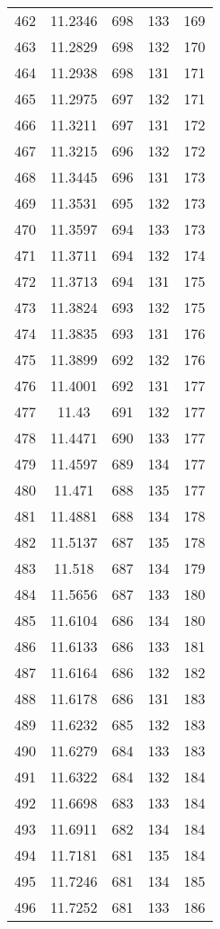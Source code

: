 \documentclass[12pt,a4paper]{article}
\begin{document}
\begin{tabular}{r|cccc}
	462 & 11.2346 & 698 & 133 & 169 \\
	463 & 11.2829 & 698 & 132 & 170 \\
	464 & 11.2938 & 698 & 131 & 171 \\
	465 & 11.2975 & 697 & 132 & 171 \\
	466 & 11.3211 & 697 & 131 & 172 \\
	467 & 11.3215 & 696 & 132 & 172 \\
	468 & 11.3445 & 696 & 131 & 173 \\
	469 & 11.3531 & 695 & 132 & 173 \\
	470 & 11.3597 & 694 & 133 & 173 \\
	471 & 11.3711 & 694 & 132 & 174 \\
	472 & 11.3713 & 694 & 131 & 175 \\
	473 & 11.3824 & 693 & 132 & 175 \\
	474 & 11.3835 & 693 & 131 & 176 \\
	475 & 11.3899 & 692 & 132 & 176 \\
	476 & 11.4001 & 692 & 131 & 177 \\
	477 & 11.43 & 691 & 132 & 177 \\
	478 & 11.4471 & 690 & 133 & 177 \\
	479 & 11.4597 & 689 & 134 & 177 \\
	480 & 11.471 & 688 & 135 & 177 \\
	481 & 11.4881 & 688 & 134 & 178 \\
	482 & 11.5137 & 687 & 135 & 178 \\
	483 & 11.518 & 687 & 134 & 179 \\
	484 & 11.5656 & 687 & 133 & 180 \\
	485 & 11.6104 & 686 & 134 & 180 \\
	486 & 11.6133 & 686 & 133 & 181 \\
	487 & 11.6164 & 686 & 132 & 182 \\
	488 & 11.6178 & 686 & 131 & 183 \\
	489 & 11.6232 & 685 & 132 & 183 \\
	490 & 11.6279 & 684 & 133 & 183 \\
	491 & 11.6322 & 684 & 132 & 184 \\
	492 & 11.6698 & 683 & 133 & 184 \\
	493 & 11.6911 & 682 & 134 & 184 \\
	494 & 11.7181 & 681 & 135 & 184 \\
	495 & 11.7246 & 681 & 134 & 185 \\
	496 & 11.7252 & 681 & 133 & 186 \\

\end{tabular}
\end{document}
